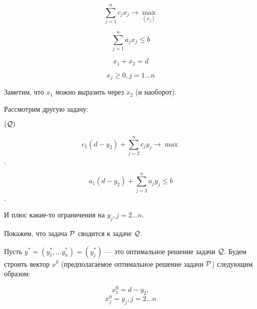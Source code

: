 \[\sum_{j=1}^{n} c_j x_j \to \max_{(x_j)}\]

\[\sum_{j=1}^{n} a_j x_j \le b\]

\[x_1 + x_2 = d \]

\[x_j \ge 0, j = 1\dots n\]

Заметим, что $x_1$ можно выразить через $x_2$ (и наоборот).

Рассмотрим другую задачу:

$(\Q)$

\[c_1(d - y_2) + \sum_{j=2}^{n} c_j y_j \to \max\].

\[a_1 (d-y_2) + \sum_{j=2}^{n}a_j y_j \le b\].

И плюс какие-то ограничения на $y_j, j=2 \dots n$.


Покажем, что задача $\P$ сводится к задаче $\Q$.

\proof

Пусть $y^* = (y^*_1, \dots y^*_n) = (y^*_j)$ --- это оптимальное решение задачи $\Q$. Будем строить вектор $x^0$ (предполагаемое оптимальное решение задачи $\P$) следующим образом:

\[x^0_1 = d - y_2,\]
\[x^0_j = y_j, j = 2 \dots n\]


